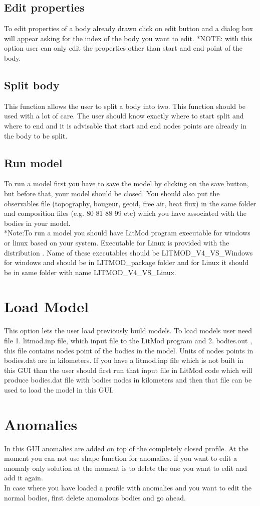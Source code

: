 \documentclass[12pt]{article}
\begin{document}
\subsection{Edit properties}
To edit properties of a body already drawn click on edit button and a dialog box will appear asking for the index of the body you want to edit. *NOTE: with this option user can only edit the properties other than start and end point of the body.
\subsection{Split body}
This function allows the user to split a body into two. This function should be used with a lot of care. The user should know exactly where to start split and where to end and it is advisable that start and end nodes points are already in the body to be split.  
\subsection{Run model}
To run a model first you have to save the model by clicking on the save button, but before that, your model should be closed. You should also put the observables file (topography, bougeur, geoid, free air, heat flux) in the same folder and composition files (e.g. 80 81 88 99 etc) which you have associated with the bodies in your model.\\ 
*Note:To run a model you should have LitMod program executable for windows or linux based on your system. Executable for Linux is provided with the distribution . Name of these executables should be LITMOD\_V4\_VS\_Windows for windows and should be in LITMOD\_package folder and for Linux it should be in same folder with name LITMOD\_V4\_VS\_Linux.
\section{Load Model}
This option lets the user load previously build models. To load models user need file 1. litmod.inp file, which input file to the LitMod program and 2. bodies.out , this file contains nodes point of the bodies in the model. Units of nodes points in bodies.dat are in kilometers. If you have a litmod.inp file which is not built in this GUI than the user should first run that input file in LitMod code which will produce bodies.dat file with bodies nodes in kilometers and then that file can be  used to load the model in this GUI.

\section{Anomalies}
In this GUI anomalies are added on top of the completely closed profile. At the moment you can not use shape function for anomalies. if you want to edit a anomaly only solution at the moment is to delete the one you want to edit and add it again.\\
In case where you have loaded a profile with anomalies and you want to edit the normal bodies, first delete  anomalous bodies and go ahead.\\
\end{document}
